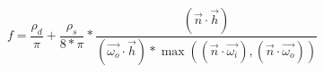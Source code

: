 \begin{equation}
    f = \frac{\rho_{d}}{\pi} + \frac{\rho_{s}}{8*\pi} *
        \frac{({\vec{n}}\cdot{\vec{h}})}
             {({\vec{\omega_{o}}}\cdot{\vec{h}}) *
               \max(({\vec{n}}\cdot{\vec{\omega_{i}}}),
                   ({\vec{n}}\cdot{\vec{\omega_{o}}}))}
\end{equation}
